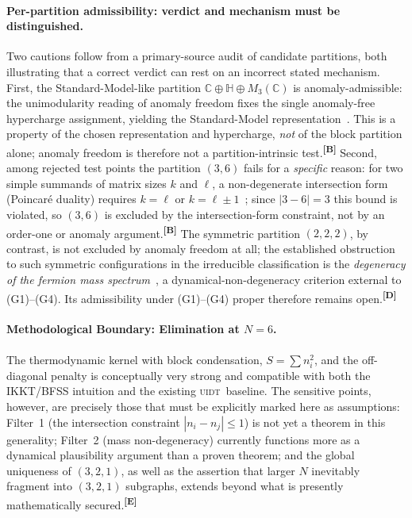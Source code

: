 \documentclass[12pt,a4paper,twoside]{article}
\theoremstyle{plain}
\theoremstyle{definition}
\theoremstyle{remark}
\newcommand{\UIDT}{\textsc{uidt}}
\newcommand{\catmark}[1]{\textsuperscript{\textsf{\textbf{[#1]}}}}
\begin{document}
\paragraph{Per-partition admissibility: verdict and mechanism must be
distinguished.} Two cautions follow from a primary-source audit of
candidate partitions, both illustrating that a correct verdict can rest on
an incorrect stated mechanism. First, the Standard-Model-like partition
$\mathbb{C}\oplus\mathbb{H}\oplus M_3(\mathbb{C})$ is anomaly-admissible:
the unimodularity reading of anomaly freedom fixes the single anomaly-free
hypercharge assignment, yielding the Standard-Model
representation~\cite{agbm1995}. This is a property of the chosen
representation and hypercharge, \emph{not} of the block partition alone;
anomaly freedom is therefore not a partition-intrinsic test.\catmark{B}
Second, among rejected test points the partition $(3,6)$ fails for a
\emph{specific} reason: for two simple summands of matrix sizes $k$ and
$\ell$, a non-degenerate intersection form (Poincar\'e duality) requires
$k=\ell$ or $k=\ell\pm 1$~\cite{iss2004}; since $|3-6|=3$ this bound is
violated, so $(3,6)$ is excluded by the intersection-form constraint, not
by an order-one or anomaly argument.\catmark{B} The symmetric partition
$(2,2,2)$, by contrast, is not excluded by anomaly freedom at all; the
established obstruction to such symmetric configurations in the
irreducible classification is the \emph{degeneracy of the fermion mass
spectrum}~\cite{iss2004}, a dynamical-non-degeneracy criterion external to
(G1)--(G4). Its admissibility under (G1)--(G4) proper therefore remains
open.\catmark{D}

\paragraph{Methodological Boundary: Elimination at $N=6$.}
The thermodynamic kernel with block condensation, $S=\sum n_i^2$, and the off-diagonal penalty is conceptually very strong and compatible with both the IKKT/BFSS intuition and the existing \UIDT\ baseline. The sensitive points, however, are precisely those that must be explicitly marked here as assumptions: Filter~1 (the intersection constraint $|n_i - n_j| \le 1$) is not yet a theorem in this generality; Filter~2 (mass non-degeneracy) currently functions more as a dynamical plausibility argument than a proven theorem; and the global uniqueness of $(3,2,1)$, as well as the assertion that larger $N$ inevitably fragment into $(3,2,1)$ subgraphs, extends beyond what is presently mathematically secured.\catmark{E}
\end{document}
